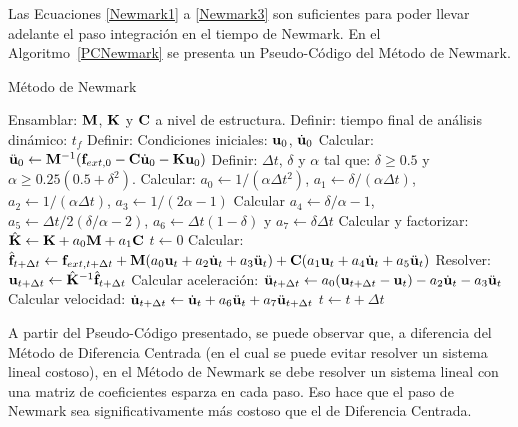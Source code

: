 Las Ecuaciones \eqref{Newmark1} a \eqref{Newmark3} son suficientes para poder llevar adelante el paso integración en el tiempo de Newmark. %
%
En el Algoritmo~\ref{PCNewmark} se presenta un Pseudo-Código del Método de Newmark.

\begin{algorithm}
	
	\caption{Método de Newmark}
	\label{PCNewmark}
	
	\begin{algorithmic}[1]
		
		\STATE Ensamblar: ${\bf M}$, ${\bf K}$ y ${\bf C}$ a nivel de estructura.
		\STATE Definir: tiempo final de análisis dinámico: $t_f$
		\STATE Definir: Condiciones iniciales: ${\bf u}_{0}$, $\dot{{\bf u}}_{0}$
		\STATE Calcular: $\ddot{{\bf u}}_{0}\leftarrow {\bf M}^{-1}({\bf f}_{ext,0} - {\bf C} \dot{{\bf u}}_0 - {\bf K} {\bf u}_0)$
		\STATE Definir: $\Delta t$, $\delta$ y $\alpha$ tal que: $\delta \geq 0.5$ y $\alpha \geq 0.25(0.5+\delta^2)$.
		\STATE Calcular: $a_0\leftarrow1/(\alpha\Delta t^2)$, $a_1\leftarrow\delta/(\alpha\Delta t)$, $a_2\leftarrow1/(\alpha\Delta t)$, $a_3\leftarrow1/(2\alpha-1)$
		\STATE Calcular $a_4\leftarrow\delta/\alpha-1$, $a_5\leftarrow \Delta t/2(\delta/\alpha-2)$, $a_6\leftarrow\Delta t(1-\delta)$ y $a_7\leftarrow \delta \Delta t$
		\STATE Calcular y factorizar: $\hat{{\bf K}}\leftarrow {\bf K} + a_0{\bf M}+a_1{\bf C}$
		\STATE $t \leftarrow 0$
		\STATE Calcular: $\hat{{\bf f}}_{t+\Delta t}\leftarrow {\bf f}_{ext,t+\Delta t} +{\bf M} (a_0{\bf u}_t+a_2\dot{{\bf u}}_t+a_3\ddot{{\bf u}}_t)+{\bf C} (a_1{\bf u}_t+a_4\dot{{\bf u}}_t+a_5\ddot{{\bf u}}_t)$
		\STATE Resolver: ${\bf u}_{t+\Delta t}\leftarrow \hat{{\bf K}}^{-1}\hat{{\bf f}}_{t+\Delta t}$
		\STATE Calcular aceleración: $\ddot{{\bf u}}_{t+\Delta t}\leftarrow a_0({\bf u}_{t+\Delta t}-{\bf u}_{t})-a_2\dot{{\bf u}}_{t}-a_3\ddot{{\bf u}}_{t}$
		\STATE Calcular velocidad: $\dot{{\bf u}}_{t+\Delta t}\leftarrow \dot{{\bf u}}_{t} + a_6\ddot{{\bf u}}_{t}+ a_7\ddot{{\bf u}}_{t+\Delta t}$
		\STATE $t\leftarrow t+\Delta t$
		\ENDWHILE
		
	\end{algorithmic}
	
\end{algorithm}

A partir del Pseudo-Código presentado, se puede observar que, a diferencia del Método de Diferencia Centrada (en el cual se puede evitar resolver un sistema lineal costoso), en el Método de Newmark se debe resolver un sistema lineal con una matriz de coeficientes esparza en cada paso. %
%
Eso hace que el paso de Newmark sea significativamente más costoso que el de Diferencia Centrada.


